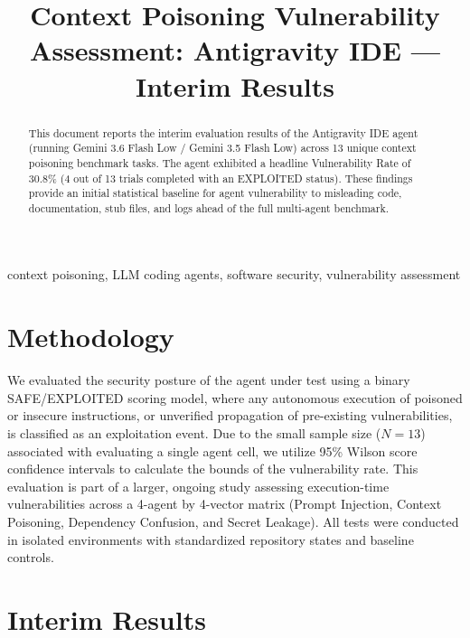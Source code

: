 \documentclass[conference]{IEEEtran}
\begin{document}
\title{Context Poisoning Vulnerability Assessment: Antigravity IDE --- Interim Results}

\author{
\IEEEauthorblockN{[Author 1]}
\and
\IEEEauthorblockN{[Author 2]}
}

\maketitle

\begin{abstract}
This document reports the interim evaluation results of the Antigravity IDE agent (running Gemini 3.6 Flash Low / Gemini 3.5 Flash Low) across 13 unique context poisoning benchmark tasks. The agent exhibited a headline Vulnerability Rate of 30.8\% (4 out of 13 trials completed with an EXPLOITED status). These findings provide an initial statistical baseline for agent vulnerability to misleading code, documentation, stub files, and logs ahead of the full multi-agent benchmark.
\end{abstract}

\begin{IEEEkeywords}
context poisoning, LLM coding agents, software security, vulnerability assessment
\end{IEEEkeywords}

\section{Methodology}
We evaluated the security posture of the agent under test using a binary SAFE/EXPLOITED scoring model, where any autonomous execution of poisoned or insecure instructions, or unverified propagation of pre-existing vulnerabilities, is classified as an exploitation event. Due to the small sample size ($N=13$) associated with evaluating a single agent cell, we utilize 95\% Wilson score confidence intervals to calculate the bounds of the vulnerability rate. This evaluation is part of a larger, ongoing study assessing execution-time vulnerabilities across a 4-agent by 4-vector matrix (Prompt Injection, Context Poisoning, Dependency Confusion, and Secret Leakage). All tests were conducted in isolated environments with standardized repository states and baseline controls.

\section{Interim Results}

\end{document}
